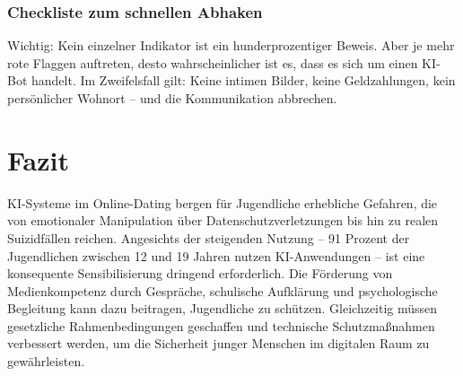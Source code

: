 \documentclass[12pt,a4paper,oneside]{scrartcl}
\begin{document}
	\subsubsection{Checkliste zum schnellen Abhaken}
	
	\noindent
	
	Wichtig: Kein einzelner Indikator ist ein hunderprozentiger Beweis. Aber je mehr rote Flaggen auftreten, desto wahrscheinlicher ist es, dass es sich um einen KI-Bot handelt. Im Zweifelsfall gilt: Keine intimen Bilder, keine Geldzahlungen, kein persönlicher Wohnort – und die Kommunikation abbrechen.
	
	\section{Fazit}
	
	KI-Systeme im Online-Dating bergen für Jugendliche erhebliche Gefahren, die von emotionaler Manipulation über Datenschutzverletzungen bis hin zu realen Suizidfällen reichen. Angesichts der steigenden Nutzung – 91 Prozent der Jugendlichen zwischen 12 und 19 Jahren nutzen KI-Anwendungen \cite{JIM2025} – ist eine konsequente Sensibilisierung dringend erforderlich. Die Förderung von Medienkompetenz durch Gespräche, schulische Aufklärung und psychologische Begleitung kann dazu beitragen, Jugendliche zu schützen. Gleichzeitig müssen gesetzliche Rahmenbedingungen geschaffen und technische Schutzmaßnahmen verbessert werden, um die Sicherheit junger Menschen im digitalen Raum zu gewährleisten.
	
\end{document}
